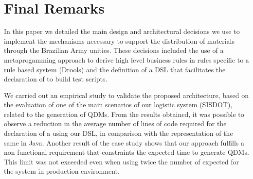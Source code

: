 \section{Final Remarks}
\label{sec:conclusao}


In this paper we detailed the main design and architectural decisions we use to 
implement the mechanisms necessary to support the distribution of materials 
through the Brazilian Army unities. These decisions included the use of 
a metaprogamming approach to derive high level business rules in rules specific to a rule 
based system (Drools) and the definition of a DSL that facilitates the declaration of \callers 
to build test scripts. 


We carried out an empirical study to validate the proposed architecture, based on the evaluation of one of the 
main scenarios of our logistic system (SISDOT), related to the generation of QDMs. From the results obtained, 
it was possible to observe a reduction in the average number of lines of code required for the declaration 
of a \callers using our DSL, in comparison with the representation of the same \shc in Java. 
Another result of the case study shows that our approach fulfills a non functional requirement that constraints 
the expected time to generate QDMs. This limit was not exceeded even when using twice the number of \callers 
expected for the system in production environment.

